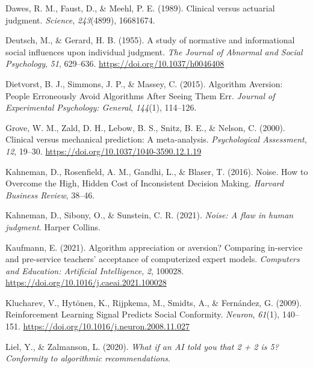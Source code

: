 \documentclass[
  man ,floatsintext]{apa7}
\newlength{\cslhangindent}
\newlength{\cslentryspacingunit} %
\newenvironment{CSLReferences}[2] %
 {%
  \setlength{\parindent}{0pt}
  \ifodd #1
  \let\oldpar\par
  \def\par{\hangindent=\cslhangindent\oldpar}
  \fi
  \setlength{\parskip}{#2\cslentryspacingunit}
 }%
 {}
\begin{document}
\begin{CSLReferences}{1}{0}
\leavevmode{}%
Dawes, R. M., Faust, D., \& Meehl, P. E. (1989). Clinical versus actuarial judgment. \emph{Science}, \emph{243}(4899), 16681674.

\leavevmode{}%
Deutsch, M., \& Gerard, H. B. (1955). A study of normative and informational social influences upon individual judgment. \emph{The Journal of Abnormal and Social Psychology}, \emph{51}, 629--636. \url{https://doi.org/10.1037/h0046408}

\leavevmode{}%
Dietvorst, B. J., Simmons, J. P., \& Massey, C. (2015). Algorithm Aversion: People Erroneously Avoid Algorithms After Seeing Them Err. \emph{Journal of Experimental Psychology: General}, \emph{144}(1), 114--126.

\leavevmode{}%
Grove, W. M., Zald, D. H., Lebow, B. S., Snitz, B. E., \& Nelson, C. (2000). Clinical versus mechanical prediction: A meta-analysis. \emph{Psychological Assessment}, \emph{12}, 19--30. \url{https://doi.org/10.1037/1040-3590.12.1.19}

\leavevmode{}%
Kahneman, D., Rosenfield, A. M., Gandhi, L., \& Blaser, T. (2016). Noise. How to Overcome the High, Hidden Cost of Inconsistent Decision Making. \emph{Harvard Business Review}, 38--46.

\leavevmode{}%
Kahneman, D., Sibony, O., \& Sunstein, C. R. (2021). \emph{Noise: A flaw in human judgment}. Harper Collins.

\leavevmode{}%
Kaufmann, E. (2021). Algorithm appreciation or aversion? Comparing in-service and pre-service teachers{'} acceptance of computerized expert models. \emph{Computers and Education: Artificial Intelligence}, \emph{2}, 100028. \url{https://doi.org/10.1016/j.caeai.2021.100028}

\leavevmode{}%
Klucharev, V., Hytönen, K., Rijpkema, M., Smidts, A., \& Fernández, G. (2009). Reinforcement Learning Signal Predicts Social Conformity. \emph{Neuron}, \emph{61}(1), 140--151. \url{https://doi.org/10.1016/j.neuron.2008.11.027}

\leavevmode{}%
Liel, Y., \& Zalmanson, L. (2020). \emph{What if an AI told you that 2 + 2 is 5? Conformity to algorithmic recommendations}.


\end{CSLReferences}
\end{document}
